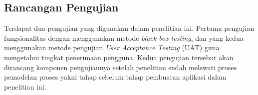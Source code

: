\begin{flushleft}
\begin{justify}
         \section{Rancangan Pengujian}
         Terdapat dua pengujian yang digunakan dalam penelitian ini. Pertama pengujian fungsionalitas dengan 
         menggunakan metode \emph{black box testing}, dan yang kedua menggunakan metode pengujian \emph{User 
         Acceptance Testing} (UAT) guna mengetahui tingkat penerimaan pengguna. Kedua pengujian tersebut akan
          dirancang komponen pengujiannya setelah penelitian sudah melewati proses pemodelan proses yakni tahap sebelum tahap pembuatan aplikasi dalam penelitian ini.\\
            

   
   \end{justify}
   
\end{flushleft}


